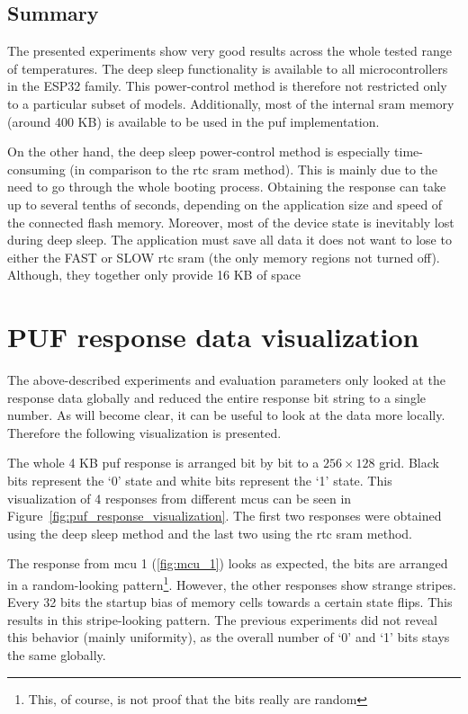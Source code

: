 \subsection{Summary}

The presented experiments show very good results across the whole tested range of temperatures. The deep sleep functionality is available to all microcontrollers in the ESP32 family. This power-control method is therefore not restricted only to a particular subset of models. Additionally, most of the internal \gls{sram} memory (around 400 KB) is available to be used in the \gls{puf} implementation.

On the other hand, the deep sleep power-control method is especially time-consuming (in comparison to the \gls{rtc} \gls{sram} method). This is mainly due to the need to go through the whole booting process. Obtaining the response can take up to several tenths of seconds, depending on the application size and speed of the connected flash memory. Moreover, most of the device state is inevitably lost during deep sleep. The application must save all data it does not want to lose to either the FAST or SLOW \gls{rtc} \gls{sram} (the only memory regions not turned off). Although, they together only provide 16 KB of space

\section{PUF response data visualization} %

The above-described experiments and evaluation parameters only looked at the response data globally and reduced the entire response bit string to a single number. As will become clear, it can be useful to look at the data more locally. Therefore the following visualization is presented.

The whole 4 KB \gls{puf} response is arranged bit by bit to a $256 \times 128$ grid. Black bits represent the `0' state and white bits represent the `1' state. This visualization of 4 responses from different \glspl{mcu} can be seen in Figure~\ref{fig:puf_response_visualization}. The first two responses were obtained using the deep sleep method and the last two using the \gls{rtc} \gls{sram} method.

The response from \gls{mcu} 1 (\ref{fig:mcu_1}) looks as expected, the bits are arranged in a random-looking pattern\footnote{This, of course, is not proof that the bits really are random}. However, the other responses show strange stripes. Every 32 bits the startup bias of memory cells towards a certain state flips. This results in this stripe-looking pattern. The previous experiments did not reveal this behavior (mainly uniformity), as the overall number of  `0' and `1' bits stays the same globally.

